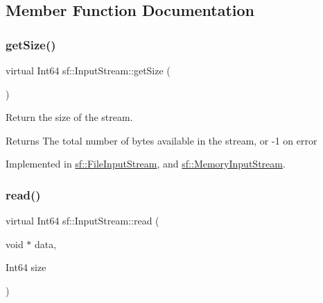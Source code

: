 \subsection{Member Function Documentation}
\mbox{\label{classsf_1_1_input_stream_a311eaaaa65d636728e5153b574b72d5d}} 
\subsubsection{\texorpdfstring{get\+Size()}{getSize()}}
{\footnotesize\ttfamily virtual Int64 sf\+::\+Input\+Stream\+::get\+Size (\begin{DoxyParamCaption}{ }\end{DoxyParamCaption})\hspace{0.3cm}{\ttfamily [pure virtual]}}



Return the size of the stream. 

\begin{DoxyReturn}{Returns}
The total number of bytes available in the stream, or -\/1 on error 
\end{DoxyReturn}


Implemented in \hyperlink{classsf_1_1_file_input_stream_aabdcaa315e088e008eeb9711ecc796e8}{sf\+::\+File\+Input\+Stream}, and \hyperlink{classsf_1_1_memory_input_stream_a6ade3ca45de361ffa0a718595f0b6763}{sf\+::\+Memory\+Input\+Stream}.

\mbox{\label{classsf_1_1_input_stream_a8dd89c74c1acb693203f50e750c6ae53}} 
\subsubsection{\texorpdfstring{read()}{read()}}
{\footnotesize\ttfamily virtual Int64 sf\+::\+Input\+Stream\+::read (\begin{DoxyParamCaption}\item[{void $\ast$}]{data,  }\item[{Int64}]{size }\end{DoxyParamCaption})\hspace{0.3cm}{\ttfamily [pure virtual]}}



